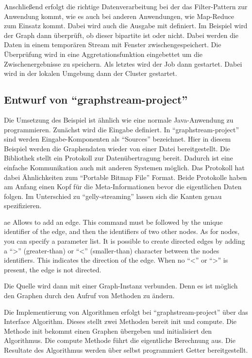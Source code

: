 Anschließend erfolgt die richtige Datenverarbeitung bei der das Filter-Pattern
zur Anwendung kommt, wie es auch bei anderen Anwendungen, wie Map-Reduce zum
Einsatz kommt. Dabei wird auch die Ausgabe mit definiert. Im Beispiel wird der
Graph dann überprüft, ob dieser bipartite ist oder nicht. Dabei werden die Daten
in einem temporären Stream mit Fenster zwischengespeichert. Die Überprüfung wird
in eine Aggretationsfunktion eingebettet um die Zwischenergebnisse zu speichern.
Als letztes wird der Job dann gestartet. Dabei wird in der lokalen Umgebung dann
der Cluster gestartet.

\subsection{Entwurf von \enquote{graphstream-project}}
Die Umsetzung des Beispiel ist ähnlich wie eine normale Java-Anwendung zu
programmieren. Zunächst wird die Eingabe definiert. In \enquote{graphstream-project}
sind werden Eingabe-Komponenten als \enquote{Sources} bezeichnet. Hier in diesem
Beispiel werden die Graphendaten wieder von einer Datei bereitgestellt. Die
Bibliothek stellt ein Protokoll zur Datenübertragung bereit. Dadurch ist eine
einfache Kommunikation auch mit anderen Systemen möglich. Das Protokoll hat dabei
Ähnlichkeiten zum \enquote{Portable Bitmap File} Format. Beide Protokolle haben
am Anfang einen Kopf für die Meta-Informationen bevor die eigentlichen Daten
folgen. Im Unterschied zu \enquote{gelly-streaming} lassen sich die Kanten
genau spezifizieren.

ae Allows to add an edge. This command must be followed by the unique identifier
of the edge, and then the identifiers of two other nodes. As for nodes, you can
specify a parameter list. It is possible to create directed edges by adding a
“>” (greater-than) or “<” (smaller-than) character between the nodes identifiers.
This indicates the direction of the edge. When no “<” or “>” is present, the
edge is not directed.

Die Quelle wird dann mit einer Graph-Instanz verbunden. Denn es ist möglich
den Graphen durch den Aufruf von Methoden zu ändern.

Die Implementierung von Algorithmen erfolgt bei \enquote{graphstream-project}
über das Interface Algorithm. Dieses stellt zwei Methoden bereit init und compute.
Die Methode init bekommt einen Graphen übergeben und initialisiert den
Algorithmus. Die compute Methode führt die eigentliche Berechnung aus.
Die Resultate des Algorithmus werden über selbst programmiert Getter
bereitgestellt.

